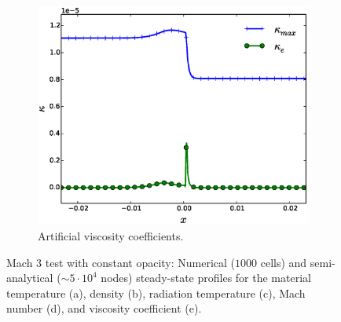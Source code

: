 \documentclass[times,doublespace]{fldauth}%
\begin{document}
\begin{figure}[h]
\begin{subfigure}{0.49\textwidth}
    \includegraphics[width=\linewidth]{figures/cst-xs/mach-3/mass-diff-visc-nel-1000-plot.eps}
    \caption{Artificial viscosity coefficients.}\label{fig:mach-3-cst-xs-visc}
    \end{subfigure}        
\caption{Mach $3$ test with constant opacity: Numerical ($1000$ cells) and semi-analytical ($\sim 5 \cdot 10^4$ nodes) steady-state profiles for the material temperature (a),  density (b),  radiation temperature (c), Mach number (d), and  viscosity coefficient (e).}\label{fig:mach-3-cst-xs}      
\end{figure}
%

\end{document}
